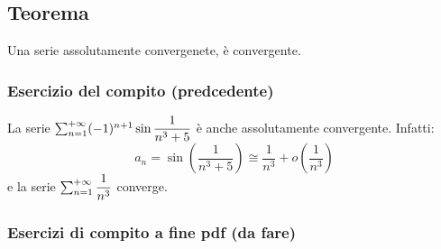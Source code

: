 \documentclass[../../main.tex]{subfiles}
\begin{document}
\subsection{Teorema}
Una serie assolutamente convergenete, è convergente.

\subsubsection{Esercizio del compito (predcedente)}
La serie $\sum_{n=1}^{+\infty} (-1)^{n+1}\sin\dfrac{1}{n^3+5}$ è anche assolutamente
convergente. Infatti:
\[
    a_n = \sin \left(\dfrac{1}{n^3+5}\right) \cong \dfrac{1}{n^3} + o\left(\dfrac{1}{n^3}\right)
\]
e la serie $\sum_{n=1}^{+\infty} \dfrac{1}{n^3}$ converge.

\subsubsection{Esercizi di compito a fine pdf (da fare)}
\end{document}
